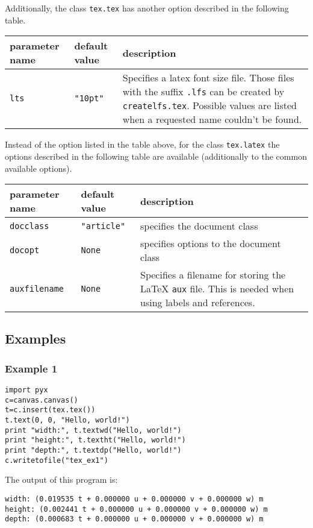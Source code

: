 Additionally, the class \verb|tex.tex| has another option described in
the following table.

\bigskip
\begin{tabularx}{\linewidth}{ll>{\raggedright\arraybackslash}X}
parameter name&default value&description\\
\hline
\texttt{lts}&\texttt{"10pt"}&Specifies a latex font size file. Those
files with the suffix \texttt{.lfs} can be created by
\texttt{createlfs.tex}. Possible values are listed when a requested
name couldn't be found.\\
\end{tabularx}
\bigskip

Instead of the option listed in the table above, for the class
\verb|tex.latex| the options described in the following table are
available (additionally to the common available options).

\bigskip
\begin{tabularx}{\linewidth}{ll>{\raggedright\arraybackslash}X}
parameter name&default value&description\\
\hline
\texttt{docclass}&\texttt{"article"}&specifies the document class\\
\texttt{docopt}&\texttt{None}&specifies options to the document class\\
\texttt{auxfilename}&\texttt{None}&Specifies a filename for storing the \LaTeX{}
\texttt{aux} file. This is needed when using labels and references.\\
\end{tabularx}

\subsection{Examples}
\subsubsection{Example 1}
\begin{verbatim}
import pyx
c=canvas.canvas()
t=c.insert(tex.tex())
t.text(0, 0, "Hello, world!")
print "width:", t.textwd("Hello, world!")
print "height:", t.textht("Hello, world!")
print "depth:", t.textdp("Hello, world!")
c.writetofile("tex_ex1")
\end{verbatim}

The output of this program is:
\begin{verbatim}
width: (0.019535 t + 0.000000 u + 0.000000 v + 0.000000 w) m
height: (0.002441 t + 0.000000 u + 0.000000 v + 0.000000 w) m
depth: (0.000683 t + 0.000000 u + 0.000000 v + 0.000000 w) m
\end{verbatim}

